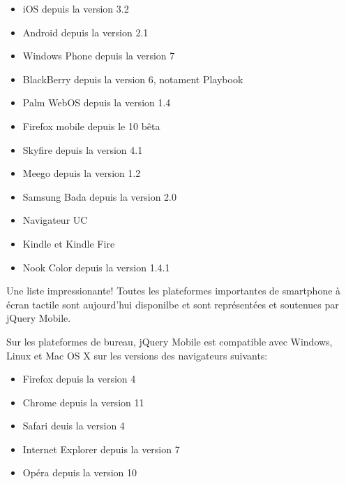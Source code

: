 \begin{itemize}
  \item[\textbullet]
  iOS depuis la version 3.2
  
  \item[\textbullet]
  Android depuis la version 2.1
  
  \item[\textbullet]
  Windows Phone depuis la version 7
  
  \item[\textbullet]
  BlackBerry depuis la version 6, notament Playbook
  
  \item[\textbullet]
  Palm WebOS depuis la version 1.4
  
  \item[\textbullet]
  Firefox mobile depuis le 10 bêta
  
  \item[\textbullet]
  Skyfire depuis la version 4.1
  
  \item[\textbullet]
  Meego depuis la version 1.2
  
  \item[\textbullet]
  Samsung Bada depuis la version 2.0
  
  \item[\textbullet]
  Navigateur UC
  
  \item[\textbullet]
  Kindle et Kindle Fire

  \item[\textbullet]
  Nook Color depuis la version 1.4.1

\end{itemize}

Une liste impressionante! Toutes les plateformes importantes de smartphone à écran tactile sont aujourd’hui disponilbe et sont représentées et soutenues par jQuery Mobile.

Sur les plateformes de bureau, jQuery Mobile est compatible avec Windows, Linux et Mac OS X sur les versions des navigateurs suivants:

\begin{itemize}
  \item[\textbullet]
  Firefox depuis la version 4
  
  \item[\textbullet]
  Chrome depuis la version 11
  
  \item[\textbullet]
  Safari deuis la version 4
  
  \item[\textbullet]
  Internet Explorer depuis la version 7
  
  \item[\textbullet]
  Opéra depuis la version 10

\end{itemize}


